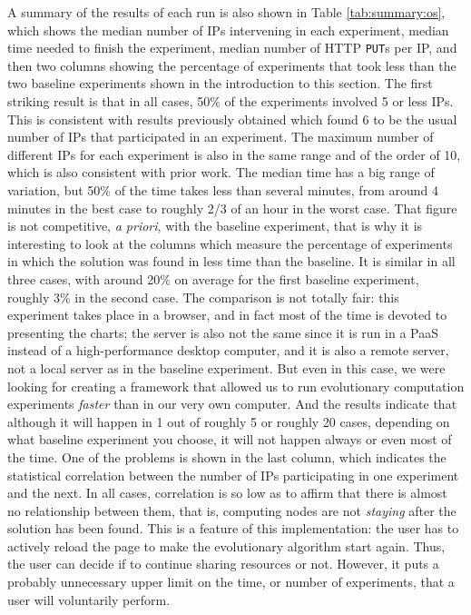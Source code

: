 \documentclass[letterpaper]{article}
\begin{document}
A summary of the results of each run is also shown in Table
\ref{tab:summary:os}, which shows the median number of IPs
intervening in each experiment,  median time needed
to finish the experiment, median number of HTTP {\tt PUT}s per IP, and
then two columns showing the percentage of experiments that took less
than the two baseline experiments shown in the introduction to this
section. The first striking result is that in all cases, 50\% of the
experiments involved 5 or less IPs. This is consistent with results
previously obtained \citep{DBLP:conf/gecco/GuervosG15} which found 6 to be
the usual number of IPs that participated in an experiment. The
maximum number of different IPs for each experiment is also in the
same range and of the order of 10, which is also consistent with
prior work. The median time has a big range of variation, but 50\% of
the time takes less than several minutes, from around 4 minutes in the
best case to roughly 2/3 of an hour in the worst case. That figure is
not competitive, {\em a priori}, with the baseline experiment, that is
why it is interesting to look at the columns which measure
the percentage of experiments in which the solution was found in less
time than the baseline. It is similar in all three cases, with around
20\% on average for the first baseline experiment, roughly 3\% in the
second case. The comparison is not totally fair: this experiment takes
place in a browser, and in fact most of the time is devoted to
presenting the charts; the server is also not the same since it is run in a
PaaS instead of a high-performance desktop computer, and it is also a
remote server, not a local server as in the baseline experiment. But
even in this case, we were looking for creating a framework that
allowed us to run evolutionary computation experiments {\em faster} than
in our very own computer. And the results indicate that although it will
happen in 1 out of roughly 5 or roughly 20 cases, depending on what baseline
experiment you choose, it will not happen always or even most of
the time. One of the problems is shown in the last column, which
indicates the statistical correlation between the number of IPs
participating in one experiment and the next. In all cases,
correlation is so low as to affirm that there is almost no
relationship between them, that is, computing nodes are not {\em
  staying} after the solution has been found. This is a feature of
this implementation: the user has to actively reload the page to make
the evolutionary algorithm start again. Thus, the user can decide if to 
continue sharing resources or not. %
However, it puts a probably            %
unnecessary upper limit on the time, or number of experiments, that a user
will voluntarily perform.
\end{document}
